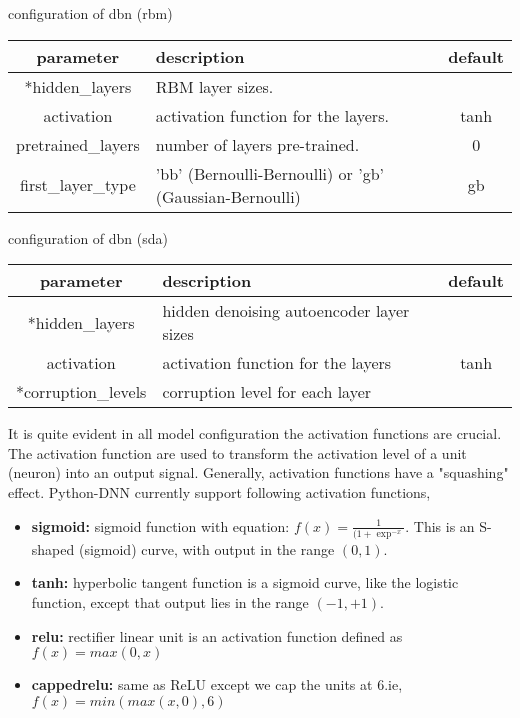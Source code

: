 \begin{table}[!htbp] 
 \begin{center}
  	\medskip  \small configuration of dbn (rbm)
	\begin{tabular}{|c|p{8cm}|c|} \hline
   	\textbf{parameter} & \textbf{description} & \textbf{default}\\  \hline
	*hidden\_layers &  RBM layer sizes. & \\ \hline
	activation & activation function for the layers. & tanh \\ \hline
	pretrained\_layers & number of layers  pre-trained. & 0 \\ \hline
	first\_layer\_type & 'bb' (Bernoulli-Bernoulli) or 'gb' (Gaussian-Bernoulli) & gb  \\ 	\hline 
	\end{tabular}		
\end{center}
\end{table} 
\begin{table}[!htbp] 
 \begin{center}
  	\medskip  \small configuration of dbn (sda)
	\begin{tabular}{|c|p{8cm}|c|} \hline
   	\textbf{parameter} & \textbf{description} & \textbf{default}\\  \hline
	*hidden\_layers &  hidden denoising autoencoder layer sizes & \\ \hline
	activation & activation function for the layers & tanh \\ \hline
	*corruption\_levels & corruption level for each layer &  \\ \hline
	\end{tabular}		
\end{center} 
\end{table} 
\noindent It is quite evident in all model configuration the activation functions are crucial.  The activation function are used to transform the activation level of a unit (neuron) into an output signal.  Generally, activation functions have a "squashing" effect.  Python-DNN currently support following activation functions,
\begin{itemize}
\item {\textbf{sigmoid:} sigmoid function with equation: $f(x) = \frac{1}{(1 + \exp^{-x}}$. This is an S-shaped (sigmoid) curve, with output in the range $(0,1)$.}
\item {\textbf{tanh:} hyperbolic tangent function is a sigmoid curve, like the logistic function, except that output lies in the range $(-1,+1)$.} 
\item {\textbf{relu:} rectifier linear unit is an activation function defined as $f(x) = max(0, x)$}
\item {\textbf{cappedrelu:} same as ReLU except we cap the units at 6.ie, $f(x) = min(max(x,0),6)$}
\end{itemize}
\clearpage

